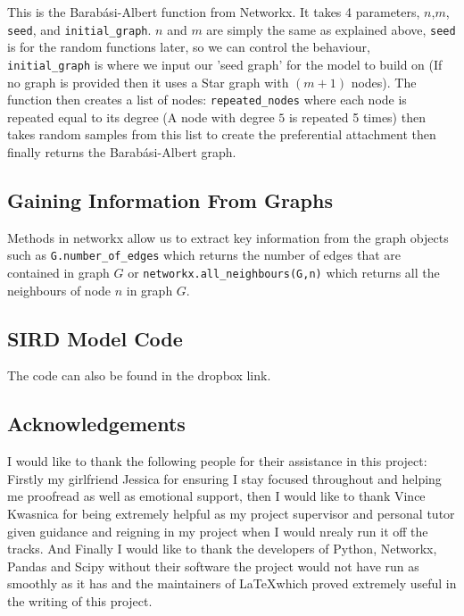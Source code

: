 \documentclass{article}
\begin{document}
        This is the Barabási-Albert function from Networkx. It takes 4 parameters, $n$,$m$, \verb|seed|, and \verb|initial_graph|. $n$ and $m$ are simply the same as explained above, \verb|seed| is for the random functions later, so we can control the behaviour,  \verb|initial_graph| is where we input our 'seed graph' for the model to build on (If no graph is provided then it uses a Star graph with $(m+1)$ nodes). The function then creates a list of nodes: \verb|repeated_nodes| where each node is repeated equal to its degree (A node with degree $5$ is repeated 5 times) then takes random samples from this list to create the preferential attachment then finally returns the Barabási-Albert graph. 
        
        \subsection{Gaining Information From Graphs}
        Methods in networkx allow us to extract key information from the graph objects such as \verb|G.number_of_edges| which returns the number of edges that are contained in graph $G$ or \verb|networkx.all_neighbours(G,n)| which returns all the neighbours of node $n$ in graph $G$.
        \subsection{SIRD Model Code}
        The code can also be found in the dropbox link.

        \subsection{Acknowledgements}
        I would like to thank the following people for their assistance in this project: Firstly my girlfriend Jessica for ensuring I stay focused throughout and helping me proofread as well as emotional support, then I would like to thank Vince Kwasnica for being extremely helpful as my project supervisor and personal tutor given guidance and reigning in my project when I would nrealy run it off the tracks. And Finally I would like to thank the developers of Python, Networkx, Pandas and Scipy without their software the project would not have run as smoothly as it has and the maintainers of \LaTeX which proved extremely useful in the writing of this project.
\printbibliography
\end{document}
